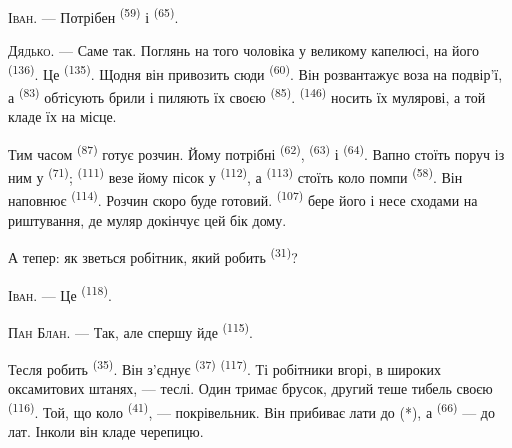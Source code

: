 \textsc{Іван}. --- Потрібен  \textsuperscript{(59)} і
 \textsuperscript{(65)}.

\textsc{Дядько}. --- Саме так. Поглянь на того чоловіка у великому капелюсі, на
його  \textsuperscript{(136)}. Це 
\textsuperscript{(135)}. Щодня він привозить сюди 
\textsuperscript{(60)}. Він розвантажує воза на подвір'ї, а 
\textsuperscript{(83)} обтісують брили і пиляють їх своєю  \textsuperscript{(85)}. 
\textsuperscript{(146)} носить їх мулярові, а той кладе їх на місце.

Тим часом  \textsuperscript{(87)} готує розчин. Йому потрібні
 \textsuperscript{(62)},  \textsuperscript{(63)} і
 \textsuperscript{(64)}. Вапно стоїть поруч із ним у 
\textsuperscript{(71)};  \textsuperscript{(111)} везе
йому пісок у  \textsuperscript{(112)}, а 
\textsuperscript{(113)} стоїть коло помпи \textsuperscript{(58)}. Він наповнює
 \textsuperscript{(114)}. Розчин скоро буде готовий.
 \textsuperscript{(107)} бере його і несе сходами на
риштування, де муляр докінчує цей бік дому.

А тепер: як зветься робітник, який робить  \textsuperscript{(31)}?

\textsc{Іван}. --- Це  \textsuperscript{(118)}.

\VUsaut{3.0mm}
\VUsaut{3.0mm}

\textsc{Пан Блан}. --- Так, але спершу йде 
\textsuperscript{(115)}.

Тесля робить  \textsuperscript{(35)}. Він з'єднує 
\textsuperscript{(37)}  \textsuperscript{(117)}. Ті робітники
вгорі, в широких оксамитових штанях, --- теслі. Один тримає брусок, другий теше
тибель своєю  \textsuperscript{(116)}. Той, що коло
 \textsuperscript{(41)}, --- покрівельник. Він прибиває лати до
 (*), а  \textsuperscript{(66)} --- до лат. Інколи
він кладе черепицю.


